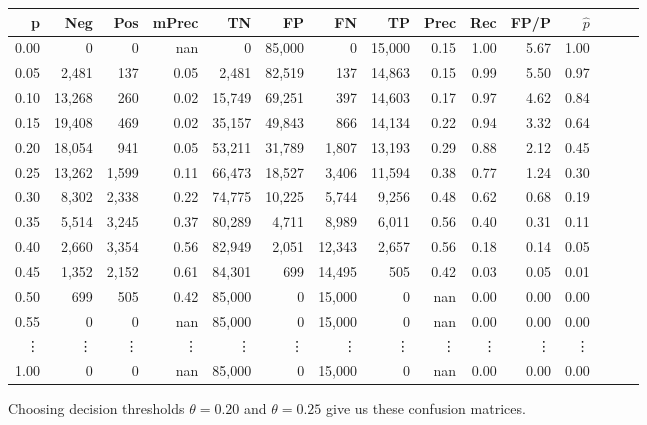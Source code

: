 \begin{tabular}{rrrrrrrrrrrrrrr}
\toprule
p &     Neg &    Pos & mPrec &      TN &      FP &      FN &      TP &  Prec &   Rec &  FP/P & $\hat{p}$ \\
\midrule
0.00 &       0 &      0 &   nan &       0 &  85,000 &       0 &  15,000 &  0.15 &  1.00 &  5.67 &      1.00 \\
0.05 &   2,481 &    137 &  0.05 &   2,481 &  82,519 &     137 &  14,863 &  0.15 &  0.99 &  5.50 &      0.97 \\
0.10 &  13,268 &    260 &  0.02 &  15,749 &  69,251 &     397 &  14,603 &  0.17 &  0.97 &  4.62 &      0.84 \\
0.15 &  19,408 &    469 &  0.02 &  35,157 &  49,843 &     866 &  14,134 &  0.22 &  0.94 &  3.32 &      0.64 \\
0.20 &  18,054 &    941 &  0.05 &  53,211 &  31,789 &   1,807 &  13,193 &  0.29 &  0.88 &  2.12 &      0.45 \\
0.25 &  13,262 &  1,599 &  0.11 &  66,473 &  18,527 &   3,406 &  11,594 &  0.38 &  0.77 &  1.24 &      0.30 \\
0.30 &   8,302 &  2,338 &  0.22 &  74,775 &  10,225 &   5,744 &   9,256 &  0.48 &  0.62 &  0.68 &      0.19 \\
0.35 &   5,514 &  3,245 &  0.37 &  80,289 &   4,711 &   8,989 &   6,011 &  0.56 &  0.40 &  0.31 &      0.11 \\
0.40 &   2,660 &  3,354 &  0.56 &  82,949 &   2,051 &  12,343 &   2,657 &  0.56 &  0.18 &  0.14 &      0.05 \\
0.45 &   1,352 &  2,152 &  0.61 &  84,301 &     699 &  14,495 &     505 &  0.42 &  0.03 &  0.05 &      0.01 \\
0.50 &     699 &    505 &  0.42 &  85,000 &       0 &  15,000 &       0 &   nan &  0.00 &  0.00 &      0.00 \\
0.55 &       0 &      0 &   nan &  85,000 &       0 &  15,000 &       0 &   nan &  0.00 &  0.00 &      0.00 \\
\vdots & \vdots & \vdots & \vdots & \vdots & \vdots & \vdots & \vdots & \vdots & \vdots & \vdots & \vdots  \\
1.00 &       0 &      0 &   nan &  85,000 &       0 &  15,000 &       0 &   nan &  0.00 &  0.00 &      0.00 \\
\bottomrule
\end{tabular}

\vskip 12pt

Choosing decision thresholds $\theta=0.20$ and $\theta = 0.25$ give us these confusion matrices.  

